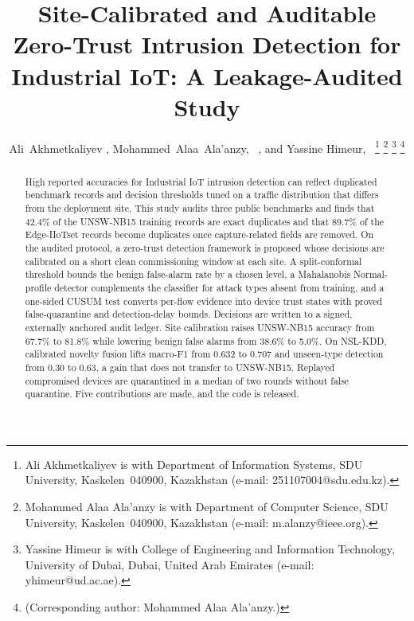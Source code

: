 \documentclass[journal]{IEEEtran}
\begin{document}
\title{Site-Calibrated and Auditable Zero-Trust Intrusion Detection for Industrial IoT: A Leakage-Audited Study}

\author{Ali~Akhmetkaliyev , Mohammed~Alaa~Ala'anzy,~ , and Yassine Himeur,~ 
\thanks{Ali Akhmetkaliyev is with Department of Information Systems, SDU University, Kaskelen~040900, Kazakhstan (e-mail: 251107004@sdu.edu.kz).}
\thanks{Mohammed Alaa Ala'anzy is with Department of Computer Science, SDU University, Kaskelen~040900, Kazakhstan (e-mail: m.alanzy@ieee.org).}
\thanks{Yassine Himeur is with College of Engineering and Information Technology, University of Dubai, Dubai, United Arab Emirates (e-mail: yhimeur@ud.ac.ae).}
\thanks{(Corresponding author: Mohammed Alaa Ala'anzy.)}}

\maketitle

\begin{abstract}
High reported accuracies for Industrial IoT intrusion detection can reflect duplicated benchmark records and decision thresholds tuned on a traffic distribution that differs from the deployment site. This study audits three public benchmarks and finds that 42.4\% of the UNSW-NB15 training records are exact duplicates and that 89.7\% of the Edge-IIoTset records become duplicates once capture-related fields are removed. On the audited protocol, a zero-trust detection framework is proposed whose decisions are calibrated on a short clean commissioning window at each site. A split-conformal threshold bounds the benign false-alarm rate by a chosen level, a Mahalanobis Normal-profile detector complements the classifier for attack types absent from training, and a one-sided CUSUM test converts per-flow evidence into device trust states with proved false-quarantine and detection-delay bounds. Decisions are written to a signed, externally anchored audit ledger. Site calibration raises UNSW-NB15 accuracy from 67.7\% to 81.8\% while lowering benign false alarms from 38.6\% to 5.0\%. On NSL-KDD, calibrated novelty fusion lifts macro-F1 from 0.632 to 0.707 and unseen-type detection from 0.30 to 0.63, a gain that does not transfer to UNSW-NB15. Replayed compromised devices are quarantined in a median of two rounds without false quarantine. Five contributions are made, and the code is released.
\end{abstract}
\end{document}
